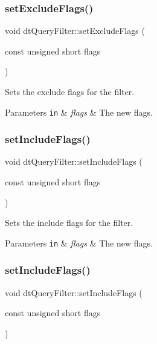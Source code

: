 \subsubsection{\texorpdfstring{set\+Exclude\+Flags()}{setExcludeFlags()}\hspace{0.1cm}{\footnotesize\ttfamily [2/2]}}
{\footnotesize\ttfamily void dt\+Query\+Filter\+::set\+Exclude\+Flags (\begin{DoxyParamCaption}\item[{const unsigned short}]{flags }\end{DoxyParamCaption})\hspace{0.3cm}{\ttfamily [inline]}}

Sets the exclude flags for the filter. 
\begin{DoxyParams}[1]{Parameters}
\mbox{\tt in}  & {\em flags} & The new flags. \\
\hline
\end{DoxyParams}
\mbox{\label{classdtQueryFilter_ab9783c92a30e41df84ebfd2f68338970}} 
\subsubsection{\texorpdfstring{set\+Include\+Flags()}{setIncludeFlags()}\hspace{0.1cm}{\footnotesize\ttfamily [1/2]}}
{\footnotesize\ttfamily void dt\+Query\+Filter\+::set\+Include\+Flags (\begin{DoxyParamCaption}\item[{const unsigned short}]{flags }\end{DoxyParamCaption})\hspace{0.3cm}{\ttfamily [inline]}}

Sets the include flags for the filter. 
\begin{DoxyParams}[1]{Parameters}
\mbox{\tt in}  & {\em flags} & The new flags. \\
\hline
\end{DoxyParams}
\mbox{\label{classdtQueryFilter_ab9783c92a30e41df84ebfd2f68338970}} 
\subsubsection{\texorpdfstring{set\+Include\+Flags()}{setIncludeFlags()}\hspace{0.1cm}{\footnotesize\ttfamily [2/2]}}
{\footnotesize\ttfamily void dt\+Query\+Filter\+::set\+Include\+Flags (\begin{DoxyParamCaption}\item[{const unsigned short}]{flags }\end{DoxyParamCaption})\hspace{0.3cm}{\ttfamily [inline]}}

